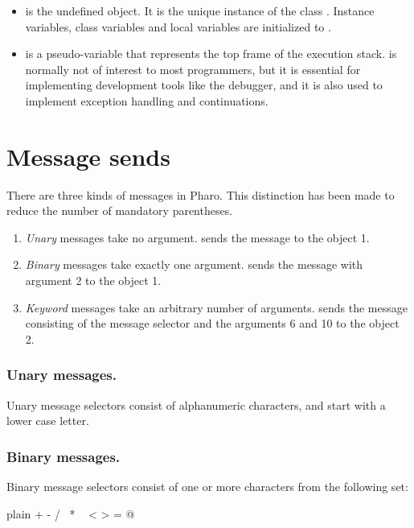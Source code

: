 \documentclass[10pt,twoside,english]{_support/latex/sbabook/sbabook}
\begin{document}
\begin{itemize}
\item {} is the undefined object. It is the unique instance of the class . Instance variables, class variables and local variables are initialized to .
\end{itemize}

\begin{itemize}
\item {} is a pseudo-variable that represents the top frame of the execution stack.  is normally not of interest to most programmers, but it is essential for implementing development tools like the debugger, and it is also used to implement exception handling and continuations.
\end{itemize}
\section{Message sends}
There are three kinds of messages in Pharo. This distinction has been made to reduce the number of mandatory parentheses.

\begin{enumerate}
\item \textit{Unary} messages take no argument.  sends the message  to the object 1.
\item \textit{Binary} messages take exactly one argument.  sends the message \textcode{+} with argument 2 to the object 1.
\item \textit{Keyword} messages take an arbitrary number of arguments.  sends the message consisting of the message selector  and the arguments 6 and 10 to the object 2.
\end{enumerate}
\subsubsection{Unary messages.}
Unary message selectors consist of alphanumeric characters, and start with a lower case letter.
\subsubsection{Binary messages.}
Binary message selectors consist of one or more characters from the following
set:

\begin{displaycode}{plain}
+ - / \ * ~ < > = @ %
\end{displaycode}
\end{document}
